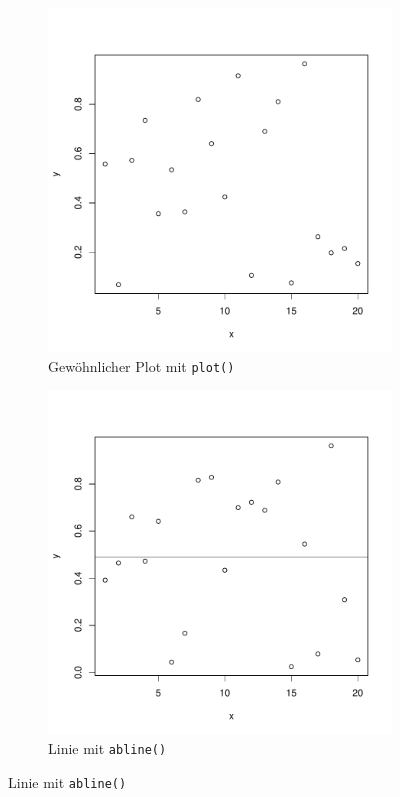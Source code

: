 \begin{figure}[h!]
\centering
\begin{subfigure}[b]{0.48\textwidth}
\includegraphics{r-cmd-022}
\caption{Gewöhnlicher Plot mit \lstinline{plot()}}
\end{subfigure}
\begin{subfigure}[b]{0.48\textwidth}
\includegraphics{r-cmd-023}
\caption{Linie mit \lstinline{abline()}}
\end{subfigure}


\end{figure}
